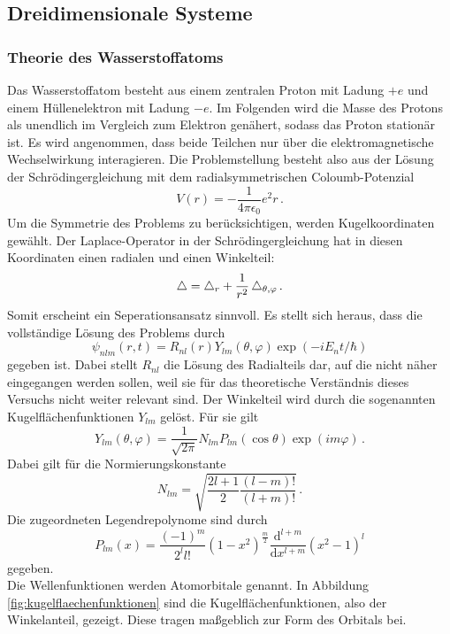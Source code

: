 \subsection{Dreidimensionale Systeme}
\label{subsec:dreidimsyst}

\subsubsection{Theorie des Wasserstoffatoms}
\label{subsubsec:hatom}
Das Wasserstoffatom besteht aus einem zentralen Proton mit Ladung $+e$ und einem Hüllenelektron mit Ladung $-e$. Im Folgenden wird die Masse des Protons als unendlich im Vergleich zum Elektron genähert, sodass das Proton stationär ist. Es wird angenommen, dass beide Teilchen nur über die elektromagnetische Wechselwirkung interagieren. Die Problemstellung besteht also aus der Lösung der Schrödingergleichung mit dem radialsymmetrischen Coloumb-Potenzial
\begin{equation}
  V(r) = - \frac{1}{4 \pi \epsilon_0}{e^2}{r}\,.
  \label{eqn:coloumb}
\end{equation}
Um die Symmetrie des Problems zu berücksichtigen, werden Kugelkoordinaten gewählt. Der Laplace-Operator in der Schrödingergleichung hat in diesen Koordinaten einen radialen und einen Winkelteil:
\begin{equation}
  \mathop{}\!\mathbin\bigtriangleup = \mathop{}\!\mathbin\bigtriangleup_r + \frac{1}{r^2} \mathop{}\!\mathbin\bigtriangleup_{\theta, \varphi}\,.
  \label{eqn:laplaceWinkel}
\end{equation}
Somit erscheint ein Seperationsansatz sinnvoll. Es stellt sich heraus, dass die vollständige Lösung des Problems durch
\begin{equation}
  \psi_{nlm}(r,t) = R_{nl}(r) Y_{lm}(\theta, \varphi) \exp(-i E_n t / \hbar)
  \label{eqn:hatomloesung}
\end{equation}
gegeben ist. Dabei stellt $R_{nl}$ die Lösung des Radialteils dar, auf die nicht näher eingegangen werden sollen, weil sie für das theoretische Verständnis dieses Versuchs nicht weiter relevant sind. Der Winkelteil wird durch die sogenannten Kugelflächenfunktionen $Y_{lm}$ gelöst. Für sie gilt
\begin{equation}
  Y_{lm}(\theta,\varphi) = \frac{1}{\sqrt{2\pi}} N_{lm} P_{lm}(\cos\theta) \exp(im\varphi)\,.
  \label{eqn:kugelflaechenfunktionen}
\end{equation}
Dabei gilt für die Normierungskonstante
\begin{equation}
  N_{lm} = \sqrt{\frac{2l+1}{2} \frac{(l-m)!}{(l+m)!}}\,.
  \label{eqn:ylmnormierung}
\end{equation}
Die zugeordneten Legendrepolynome sind durch
\begin{equation}
  P_{lm}(x) = \frac{(-1)^m}{2^l l!} (1-x^2)^{\frac{m}{2}} \frac{\mathrm{d}^{l+m}}{\mathrm{d}x^{l+m}} (x^2-1)^l
  \label{eqn:zugeordneteLegendrepolynome}
\end{equation}
gegeben.\\
Die Wellenfunktionen werden Atomorbitale genannt. In Abbildung \ref{fig:kugelflaechenfunktionen} sind die Kugelflächenfunktionen, also der Winkelanteil, gezeigt. Diese tragen maßgeblich zur Form des Orbitals bei.

